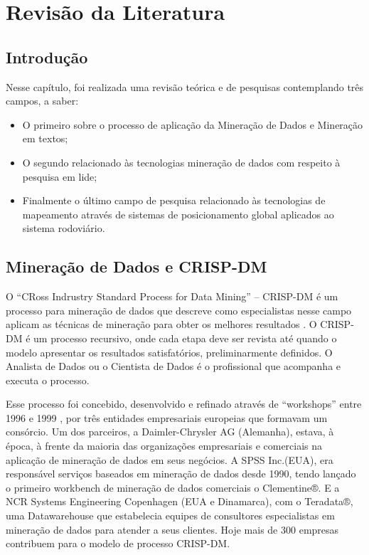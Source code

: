 \chapter{Revisão da Literatura}\label{arte}


\section{Introdução}\label{arte:intro}

Nesse capítulo, foi realizada uma revisão teórica e de pesquisas contemplando três campos, a saber: 
  \begin{itemize}
    \item O primeiro sobre o processo de aplicação da Mineração de Dados e Mineração em textos;
    \item O segundo relacionado às tecnologias mineração de dados com respeito à pesquisa em lide;
    \item Finalmente o último campo de pesquisa relacionado às tecnologias de mapeamento através de sistemas de posicionamento global 
    aplicados ao sistema rodoviário.
  \end{itemize}


  
\section{Mineração de Dados e CRISP-DM}

O ``CRoss Indrustry Standard Process for Data Mining'' -- CRISP-DM é um processo para mineração de dados que descreve como especialistas 
nesse campo aplicam as técnicas de mineração para obter os melhores resultados \cite{Crisp2000}.
O CRISP-DM é um processo recursivo, onde cada etapa deve ser revista até quando o modelo apresentar os resultados satisfatórios, preliminarmente definidos.
O Analista de Dados ou o Cientista de Dados é o profissional que acompanha e executa o processo.

Esse processo foi concebido, desenvolvido e refinado através de ``workshops'' entre 1996 e 1999 \cite{Crisp2000}, por três entidades empresariais europeias que 
formavam um consórcio. Um dos parceiros, a Daimler-Chrysler AG (Alemanha), estava, à época, à frente da maioria das organizações empresariais e comerciais 
na aplicação de mineração de dados em seus negócios. A
SPSS Inc.(EUA), era responsável serviços baseados em mineração de dados desde 1990, tendo lançado o primeiro workbench de mineração 
de dados comerciais o Clementine®. 
E a NCR Systems Engineering Copenhagen (EUA e Dinamarca), com o Teradata®, uma Datawarehouse que estabelecia equipes de consultores especialistas em mineração 
de dados para atender a seus clientes. Hoje mais de 300 empresas contribuem para o modelo de processo CRISP-DM.

